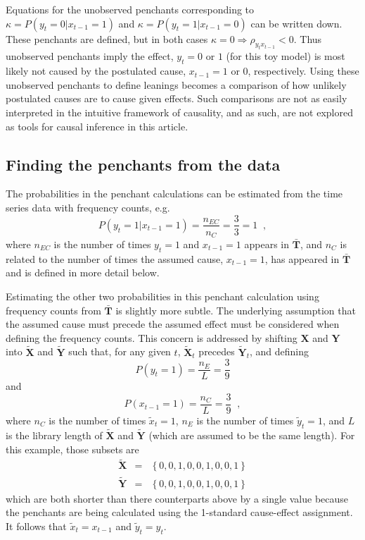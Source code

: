 \documentclass[a4paper,11pt,twocolumn]{article}
\begin{document}
Equations for the unobserved penchants corresponding to $\kappa = P\left( y_t = 0 | x_{t-1} = 1\right)$ and $\kappa = P\left( y_t = 1 | x_{t-1} = 0\right)$ can be written down.  These penchants are defined, but in both cases $\kappa=0\Rightarrow \rho_{y_{t}x_{t-1}} < 0$.  Thus unobserved penchants imply the effect, $y_t = 0$ or $1$ (for this toy model) is most likely not caused by the postulated cause, $x_{t-1} = 1$ or $0$, respectively.  Using these unobserved penchants to define leanings becomes a comparison of how unlikely postulated causes are to cause given effects.  Such comparisons are not as easily interpreted in the intuitive framework of causality, and as such, are not explored as tools for causal inference in this article. 

\subsection{Finding the penchants from the data}
The probabilities in the penchant calculations can be estimated from the time series data with frequency counts, e.g.\
$$
P\left( y_t = 1 | x_{t-1} = 1\right) = \frac{n_{EC}}{n_C} = \frac{3}{3} = 1\;\;,
$$
where $n_{EC}$ is the number of times $y_t=1$ and $x_{t-1}=1$ appears in $\bar{\mathbf{T}}$, and $n_{C}$ is related to the number of times the assumed cause, $x_{t-1}=1$, has appeared in $\bar{\mathbf{T}}$ and is defined in more detail below.      

Estimating the other two probabilities in this penchant calculation using frequency counts from $\bar{\mathbf{T}}$ is slightly more subtle.  The underlying assumption that the assumed cause must precede the assumed effect must be considered when defining the frequency counts.  This concern is addressed by shifting $\mathbf{X}$ and $\mathbf{Y}$ into $\tilde{\mathbf{X}}$ and $\tilde{\mathbf{Y}}$ such that, for any given $t$, $\tilde{\mathbf{X}}_t$ precedes $\tilde{\mathbf{Y}}_t$, and defining 
\begin{equation}
P\left( y_t = 1\right) = \frac{n_E}{L} = \frac{3}{9}
\end{equation}
and
\begin{equation}
P\left( x_{t-1} = 1\right) = \frac{n_C}{L} = \frac{3}{9}\;\;,
\end{equation}
where $n_C$ is the number of times $\tilde{x}_t = 1$, $n_E$ is the number of times $\tilde{y}_t = 1$, and $L$ is the library length of $\tilde{\mathbf{X}}$ and $\tilde{\mathbf{Y}}$ (which are assumed to be the same length).  For this example, those subsets are
\begin{eqnarray*}
\tilde{\mathbf{X}} &=& \left\{0,0,1,0,0,1,0,0,1\right\}\\
\tilde{\mathbf{Y}} &=& \left\{0,0,1,0,0,1,0,0,1\right\}
\end{eqnarray*}
which are both shorter than there counterparts above by a single value because the penchants are being calculated using the 1-standard cause-effect assignment.  It follows that $\tilde{x}_t = x_{t-1}$ and $\tilde{y}_t=y_t$.  
\end{document}
